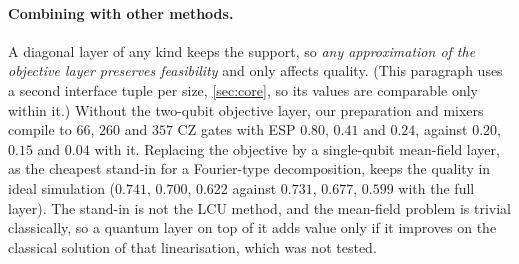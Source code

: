 \paragraph{Combining with other methods.} A diagonal layer of any kind keeps the support, so \emph{any approximation of the objective layer preserves feasibility} and only affects quality. (This paragraph uses a second interface tuple per size, \cref{sec:core}, so its values are comparable only within it.) Without the two-qubit objective layer, our preparation and mixers compile to $66$, $260$ and $357$ CZ gates with ESP $0.80$, $0.41$ and $0.24$, against $0.20$, $0.15$ and $0.04$ with it. Replacing the objective by a single-qubit mean-field layer, as the cheapest stand-in for a Fourier-type decomposition, keeps the quality in ideal simulation ($0.741$, $0.700$, $0.622$ against $0.731$, $0.677$, $0.599$ with the full layer). The stand-in is not the LCU method, and the mean-field problem is trivial classically, so a quantum layer on top of it adds value only if it improves on the classical solution of that linearisation, which was not tested.

